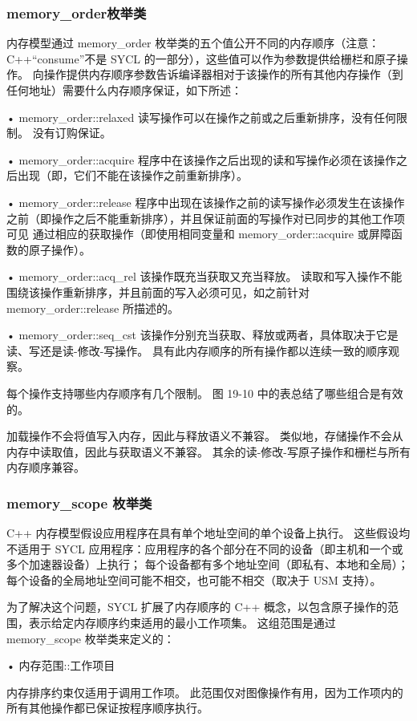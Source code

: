 \subsubsection{memory\_order枚举类}
内存模型通过 memory\_order 枚举类的五个值公开不同的内存顺序（注意：C++“consume”不是 SYCL 的一部分），这些值可以作为参数提供给栅栏和原子操作。 向操作提供内存顺序参数告诉编译器相对于该操作的所有其他内存操作（到任何地址）需要什么内存顺序保证，如下所述：

• memory\_order::relaxed 读写操作可以在操作之前或之后重新排序，没有任何限制。 没有订购保证。

• memory\_order::acquire 程序中在该操作之后出现的读和写操作必须在该操作之后出现（即，它们不能在该操作之前重新排序）。

• memory\_order::release 程序中出现在该操作之前的读写操作必须发生在该操作之前（即操作之后不能重新排序），并且保证前面的写操作对已同步的其他工作项可见 通过相应的获取操作（即使用相同变量和 memory\_order::acquire 或屏障函数的原子操作）。

• memory\_order::acq\_rel 该操作既充当获取又充当释放。 读取和写入操作不能围绕该操作重新排序，并且前面的写入必须可见，如之前针对 memory\_order::release 所描述的。

• memory\_order::seq\_cst 该操作分别充当获取、释放或两者，具体取决于它是读、写还是读-修改-写操作。 具有此内存顺序的所有操作都以连续一致的顺序观察。

每个操作支持哪些内存顺序有几个限制。 图 19-10 中的表总结了哪些组合是有效的。

加载操作不会将值写入内存，因此与释放语义不兼容。 类似地，存储操作不会从内存中读取值，因此与获取语义不兼容。 其余的读-修改-写原子操作和栅栏与所有内存顺序兼容。

\subsubsection{memory\_scope 枚举类}
C++ 内存模型假设应用程序在具有单个地址空间的单个设备上执行。 这些假设均不适用于 SYCL 应用程序：应用程序的各个部分在不同的设备（即主机和一个或多个加速器设备）上执行； 每个设备都有多个地址空间（即私有、本地和全局）； 每个设备的全局地址空间可能不相交，也可能不相交（取决于 USM 支持）。

为了解决这个问题，SYCL 扩展了内存顺序的 C++ 概念，以包含原子操作的范围，表示给定内存顺序约束适用的最小工作项集。 这组范围是通过 memory\_scope 枚举类来定义的：

• 内存范围::工作项目

内存排序约束仅适用于调用工作项。 此范围仅对图像操作有用，因为工作项内的所有其他操作都已保证按程序顺序执行。

